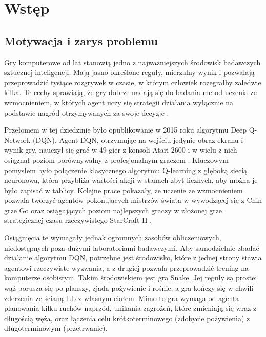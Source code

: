 \section{Wstęp}
\label{sec:wstep}

\subsection{Motywacja i zarys problemu}
\label{subsec:motywacja}

Gry komputerowe od lat stanowią jedno z najważniejszych środowisk badawczych sztucznej inteligencji. Mają jasno określone reguły, mierzalny wynik i pozwalają przeprowadzić tysiące rozgrywek w czasie, w którym człowiek rozegrałby zaledwie kilka. Te cechy sprawiają, że gry dobrze nadają się do badania metod uczenia ze wzmocnieniem, w których agent uczy się strategii działania wyłącznie na podstawie nagród otrzymywanych za swoje decyzje \cite{sutton2018}.

Przełomem w tej dziedzinie było opublikowanie w 2015 roku algorytmu Deep Q-Network (DQN). Agent DQN, otrzymując na wejściu jedynie obraz ekranu i wynik gry, nauczył się grać w 49 gier z konsoli Atari 2600 i w wielu z nich osiągnął poziom porównywalny z profesjonalnym graczem \cite{mnih2015}. Kluczowym pomysłem było połączenie klasycznego algorytmu Q-learning \cite{watkins1992} z głęboką siecią neuronową, która przybliża wartości akcji w stanach zbyt licznych, aby można je było zapisać w tablicy. Kolejne prace pokazały, że uczenie ze wzmocnieniem pozwala tworzyć agentów pokonujących mistrzów świata w wywodzącej się z Chin grze Go \cite{silver2016} oraz osiągających poziom najlepszych graczy w złożonej grze strategicznej czasu rzeczywistego StarCraft II \cite{vinyals2019}.

Osiągnięcia te wymagały jednak ogromnych zasobów obliczeniowych, niedostępnych poza dużymi laboratoriami badawczymi. Aby samodzielnie zbadać działanie algorytmu DQN, potrzebne jest środowisko, które z jednej strony stawia agentowi rzeczywiste wyzwania, a z drugiej pozwala przeprowadzić trening na komputerze osobistym. Takim środowiskiem jest gra Snake. Jej reguły są proste: wąż porusza się po planszy, zjada pożywienie i rośnie, a gra kończy się w chwili zderzenia ze ścianą lub z własnym ciałem. Mimo to gra wymaga od agenta planowania kilku ruchów naprzód, unikania zagrożeń, które zmieniają się wraz z długością węża, oraz łączenia celu krótkoterminowego (zdobycie pożywienia) z długoterminowym (przetrwanie).

